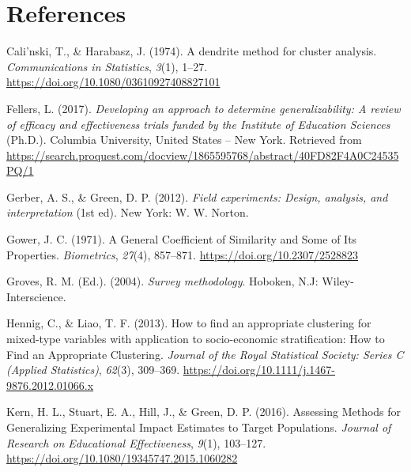 \documentclass[
  english,
  man,floatsintext]{apa6}
\begin{document}
\newpage

\hypertarget{references}{%
\section{References}\label{references}}

\begingroup
\setlength{\parindent}{-0.5in}
\setlength{\leftskip}{0.5in}

\hypertarget{refs}{}
\leavevmode\hypertarget{ref-calinskiDendriteMethodCluster1974}{}%
Cali\a'nski, T., \& Harabasz, J. (1974). A dendrite method for cluster analysis. \emph{Communications in Statistics}, \emph{3}(1), 1--27. \url{https://doi.org/10.1080/03610927408827101}

\leavevmode\hypertarget{ref-fellersDevelopingApproachDetermine2017}{}%
Fellers, L. (2017). \emph{Developing an approach to determine generalizability: A review of efficacy and effectiveness trials funded by the Institute of Education Sciences} (Ph.D.). Columbia University, United States -- New York. Retrieved from \url{https://search.proquest.com/docview/1865595768/abstract/40FD82F4A0C24535PQ/1}

\leavevmode\hypertarget{ref-gerberFieldExperimentsDesign2012}{}%
Gerber, A. S., \& Green, D. P. (2012). \emph{Field experiments: Design, analysis, and interpretation} (1st ed). New York: W. W. Norton.

\leavevmode\hypertarget{ref-gowerGeneralCoefficientSimilarity1971}{}%
Gower, J. C. (1971). A General Coefficient of Similarity and Some of Its Properties. \emph{Biometrics}, \emph{27}(4), 857--871. \url{https://doi.org/10.2307/2528823}

\leavevmode\hypertarget{ref-grovesSurveyMethodology2004}{}%
Groves, R. M. (Ed.). (2004). \emph{Survey methodology}. Hoboken, N.J: Wiley-Interscience.

\leavevmode\hypertarget{ref-hennigHowFindAppropriate2013}{}%
Hennig, C., \& Liao, T. F. (2013). How to find an appropriate clustering for mixed-type variables with application to socio-economic stratification: How to Find an Appropriate Clustering. \emph{Journal of the Royal Statistical Society: Series C (Applied Statistics)}, \emph{62}(3), 309--369. \url{https://doi.org/10.1111/j.1467-9876.2012.01066.x}

\leavevmode\hypertarget{ref-kernAssessingMethodsGeneralizing2016}{}%
Kern, H. L., Stuart, E. A., Hill, J., \& Green, D. P. (2016). Assessing Methods for Generalizing Experimental Impact Estimates to Target Populations. \emph{Journal of Research on Educational Effectiveness}, \emph{9}(1), 103--127. \url{https://doi.org/10.1080/19345747.2015.1060282}
\end{document}
